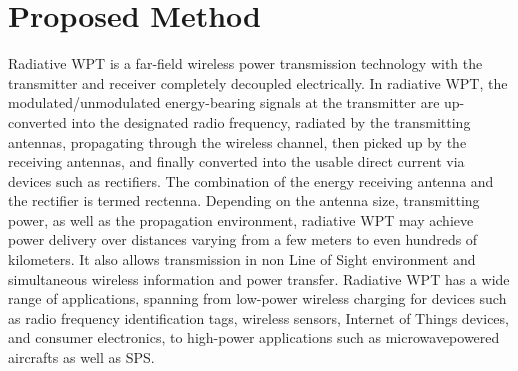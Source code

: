 \documentclass[hidelinks, 12pt]{report}
\begin{document}
\section{Proposed Method}
\justify
Radiative WPT is a far-field wireless power transmission technology with the transmitter and receiver completely decoupled electrically. In radiative WPT, the modulated/unmodulated energy-bearing signals at the transmitter are up-converted into the designated radio frequency, radiated by the transmitting antennas, propagating through the wireless channel, then picked up by the receiving antennas, and finally converted into the usable direct current via devices such as rectifiers. The combination of the energy receiving antenna and the rectifier is termed rectenna. Depending on the antenna size, transmitting power, as well as the propagation environment, radiative WPT may achieve power delivery over distances varying from a few meters to even hundreds of kilometers. It also allows transmission in non Line of Sight environment and simultaneous wireless information and power transfer. Radiative WPT has a wide range of applications, spanning from low-power wireless charging for devices such as radio frequency identification tags, wireless sensors, Internet of Things devices, and consumer electronics, to high-power applications such as microwavepowered aircrafts as well as SPS. 
\end{document}
